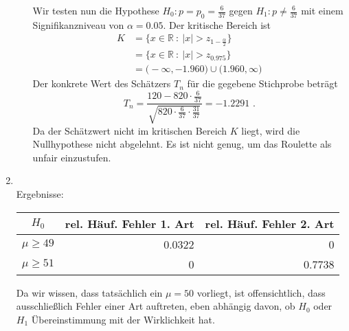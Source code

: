 \documentclass[a4paper]{scrartcl}
\def \blattnr {9}
\begin{document}
\begin{enumerate}[label=\bfseries \blattnr.\arabic*]
\begin{enumerate}
                Wir testen nun die Hypothese $H_0 \colon p = p_0 =
                \frac{6}{37}$ gegen $H_1 \colon p \neq \frac{6}{37}$ mit einem
                Signifikanzniveau von $\alpha = \num{0,05}$.
                Der kritische Bereich ist
                \begin{equation*}
                    \begin{split}
                        K
                        &= \{ x \in \mathbb{R}\ :\ |x| > z_{1-\frac{\alpha}{2}} \} \\
                        &= \{ x \in \mathbb{R}\ :\ |x| > z_{\num{0,975}} \} \\
                        &= \Big( -\infty, \num{-1,960} \Big) \cup \Big( \num{1,960}, \infty \Big)
                    \end{split}
                \end{equation*}
                Der konkrete Wert des Schätzers $T_n$ für die gegebene
                Stichprobe beträgt
                \begin{equation*}
                    T_n
                    = \frac{120 - 820 \cdot \frac{6}{37}}{\sqrt{820 \cdot \frac{6}{37} \cdot \frac{31}{37}}}
                    = \num{-1,2291}
                    \text{ .}
                \end{equation*}
                Da der Schätzwert nicht im kritischen Bereich $K$ liegt, wird
                die Nullhypothese nicht abgelehnt. Es ist nicht genug, um das
                Roulette als unfair einzustufen.
	
        \end{enumerate}

    \pagebreak
    \item \hfill \\ 
      
      
      \pagebreak
      Ergebnisse:
      
      \begin{tabular}{c|r|r}
       $H_0$ & rel. Häuf. Fehler 1. Art & rel. Häuf. Fehler 2. Art \\
       \hline
       $\mu \geq 49$ & 0.0322 & 0 \\
       $\mu \geq 51$ & 0 & 0.7738
      \end{tabular}
      
      Da wir wissen, dass tatsächlich ein $\mu=50$ vorliegt, ist
      offensichtlich, dass ausschließlich Fehler einer Art auftreten, eben
      abhängig davon, ob $H_0$ oder $H_1$ Übereinstimmung mit der Wirklichkeit
      hat.
      

\end{enumerate}
\end{document}
